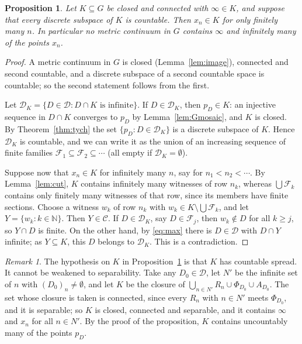 \documentclass[11pt]{amsart}
\newtheorem{proposition}[theorem]{Proposition}
\theoremstyle{definition}
\theoremstyle{remark}
\newtheorem{remark}[theorem]{Remark}
\newcommand{\N}{\mathbb{N}}
\newcommand{\cD}{\mathcal{D}}
\newcommand{\cC}{\mathcal{C}}
\numberwithin{equation}{section}
\begin{document}
\begin{proposition}\label{prop:nocapture}
Let $K\subseteq G$ be closed and connected with $\infty\in K$, and suppose that every discrete subspace of $K$ is countable. Then $x_n\in K$ for only finitely many $n$. In particular no metric continuum in $G$ contains $\infty$ and infinitely many of the points $x_n$.
\end{proposition}
\begin{proof}
A metric continuum in $G$ is closed (Lemma~\ref{lem:image}), connected and second countable, and a discrete subspace of a second countable space is countable; so the second statement follows from the first.

Let $\cD_K=\{D\in\cD:D\cap K\text{ is infinite}\}$. If $D\in\cD_K$, then $p_D\in K$: an injective sequence in $D\cap K$ converges to $p_D$ by Lemma~\ref{lem:Gmosaic}, and $K$ is closed. By Theorem~\ref{thm:tych} the set $\{p_D:D\in\cD_K\}$ is a discrete subspace of $K$. Hence $\cD_K$ is countable, and we can write it as the union of an increasing sequence of finite families $\mathcal F_1\subseteq\mathcal F_2\subseteq\cdots$ (all empty if $\cD_K=\emptyset$).

Suppose now that $x_n\in K$ for infinitely many $n$, say for $n_1<n_2<\cdots$. By Lemma~\ref{lem:cut}, $K$ contains infinitely many witnesses of row $n_k$, whereas $\bigcup\mathcal F_k$ contains only finitely many witnesses of that row, since its members have finite sections. Choose a witness $w_k$ of row $n_k$ with $w_k\in K\setminus\bigcup\mathcal F_k$, and let $Y=\{w_k:k\in\N\}$. Then $Y\in\cC$. If $D\in\cD_K$, say $D\in\mathcal F_j$, then $w_k\notin D$ for all $k\ge j$, so $Y\cap D$ is finite. On the other hand, by \eqref{eq:max} there is $D\in\cD$ with $D\cap Y$ infinite; as $Y\subseteq K$, this $D$ belongs to $\cD_K$. This is a contradiction.
\end{proof}

\begin{remark}\label{rem:spread}
The hypothesis on $K$ in Proposition~\ref{prop:nocapture} is that $K$ has countable spread. It cannot be weakened to separability. Take any $D_0\in\cD$, let $N'$ be the infinite set of $n$ with $(D_0)_n\ne\emptyset$, and let $K$ be the closure of $\bigcup_{n\in N'}R_n\cup\Phi_{D_0}\cup A_{D_0}$. The set whose closure is taken is connected, since every $R_n$ with $n\in N'$ meets $\Phi_{D_0}$, and it is separable; so $K$ is closed, connected and separable, and it contains $\infty$ and $x_n$ for all $n\in N'$. By the proof of the proposition, $K$ contains uncountably many of the points $p_D$.
\end{remark}
\end{document}

